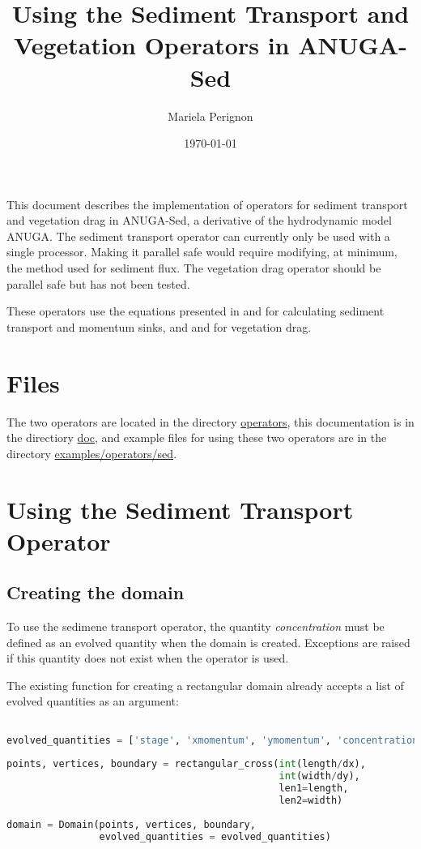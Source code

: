 \documentclass[10pt]{article}
\begin{document}
\title{Using the Sediment Transport and Vegetation Operators in ANUGA-Sed}
\author{Mariela Perignon}
\date{\today}
\maketitle

This document describes the implementation of operators for sediment transport and vegetation drag in ANUGA-Sed, a derivative of the hydrodynamic model ANUGA. The sediment transport operator can currently only be used with a single processor. Making it parallel safe would require modifying, at minimum, the method used for sediment flux. The vegetation drag operator should be parallel safe but has not been tested.

These operators use the equations presented in \citet{Simpson:2006aa} and \citet{davy2009fluvial} for calculating sediment transport and momentum sinks, and \citet{nepf1999drag} and \citet{kean2006form} for vegetation drag.

\section{Files}

The two operators are located in the directory \url{operators}, this documentation is in the directiory \url{doc}, and example files for using these two operators are in the directory \url{examples/operators/sed}.

\section{Using the Sediment Transport Operator}

\subsection{Creating the domain}\label{domain}

To use the sedimene transport operator, the quantity \textit{concentration} must be defined as an evolved quantity when the domain is created. Exceptions are raised if this quantity does not exist when the operator is used.

The existing function for creating a rectangular domain already accepts a list of evolved quantities as an argument:

\begin{minipage}[c]{0.95\textwidth}
\begin{lstlisting}[language=Python, title=Creating a rectangular domain]

evolved_quantities = ['stage', 'xmomentum', 'ymomentum', 'concentration']
			  
points, vertices, boundary = rectangular_cross(int(length/dx),
									    	   int(width/dy),
									    	   len1=length,
									    	   len2=width)
                                                  	
domain = Domain(points, vertices, boundary,
				evolved_quantities = evolved_quantities)

\end{lstlisting}
\end{minipage}
\ \\
\end{document}
